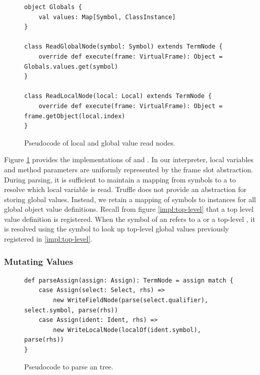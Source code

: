 \begin{figure}[!htb]
\begin{verbatim}
object Globals {
	val values: Map[Symbol, ClassInstance]
}

class ReadGlobalNode(symbol: Symbol) extends TermNode {
	override def execute(frame: VirtualFrame): Object = Globals.values.get(symbol)
}

class ReadLocalNode(local: Local) extends TermNode {
	override def execute(frame: VirtualFrame): Object = frame.getObject(local.index)
}
\end{verbatim}
\caption{Pseudocode of local and global value read nodes.}
\label{impl:local-global-node}
\end{figure}
Figure \ref{impl:local-global-node} provides the implementations of  and .
In our interpreter, local variables and method parameters are uniformly represented by the frame slot abstraction.
During parsing, it is sufficient to maintain a mapping from symbols to a  to resolve which local variable is read.
Truffle does not provide an abstraction for storing global values.
Instead, we retain a mapping of symbols to instances for all global object value definitions.
Recall from figure \ref{impl:top-level} that a top level value definition is registered.
When the symbol of an  refers to a  or a top-level , it is resolved using the symbol to look up top-level global values previously registered in \ref{impl:top-level}.

\subsubsection*{Mutating Values}

\begin{figure}[!htb]
\begin{verbatim}
def parseAssign(assign: Assign): TermNode = assign match {
	case Assign(select: Select, rhs) => 
		new WriteFieldNode(parse(select.qualifier), select.symbol, parse(rhs)) 
	case Assign(ident: Ident, rhs) =>
		new WriteLocalNode(localOf(ident.symbol), parse(rhs)) 
}
\end{verbatim}
\caption{Pseudocode to parse an  tree.}
\label{impl:parse-assign}
\end{figure}

